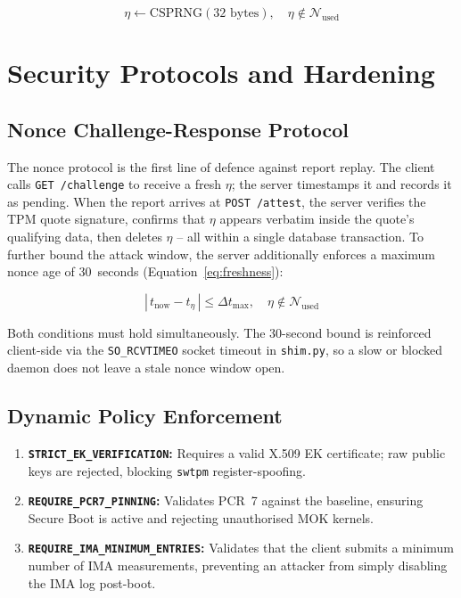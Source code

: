 \documentclass[11pt]{article}
\begin{document}
\begin{equation}
  \eta \leftarrow \text{CSPRNG}(32\text{ bytes}), \quad \eta \notin \mathcal{N}_{\text{used}}
  \label{eq:nonce}
\end{equation}

\section{Security Protocols and Hardening}

\subsection{Nonce Challenge-Response Protocol}
The nonce protocol is the first line of defence against report replay. The client calls \texttt{GET /challenge} to receive a fresh $\eta$; the server timestamps it and records it as pending. When the report arrives at \texttt{POST /attest}, the server verifies the TPM quote signature, confirms that $\eta$ appears verbatim inside the quote's qualifying data, then deletes $\eta$ -- all within a single database transaction. To further bound the attack window, the server additionally enforces a maximum nonce age of 30~seconds (Equation~\ref{eq:freshness}):

\begin{equation}
  |\,t_{\text{now}} - t_{\eta}\,| \leq \Delta t_{\max}, \quad \eta \notin \mathcal{N}_{\text{used}}
  \label{eq:freshness}
\end{equation}

\noindent Both conditions must hold simultaneously. The 30-second bound is reinforced client-side via the \texttt{SO\_RCVTIMEO} socket timeout in \texttt{shim.py}, so a slow or blocked daemon does not leave a stale nonce window open.

\subsection{Dynamic Policy Enforcement}
\begin{enumerate}[nosep]
  \item \textbf{\texttt{STRICT\_EK\_VERIFICATION}:} Requires a valid X.509 EK certificate; raw public keys are rejected, blocking \texttt{swtpm} register-spoofing.
  \item \textbf{\texttt{REQUIRE\_PCR7\_PINNING}:} Validates PCR~7 against the baseline, ensuring Secure Boot is active and rejecting unauthorised MOK kernels.
  \item \textbf{\texttt{REQUIRE\_IMA\_MINIMUM\_ENTRIES}:} Validates that the client submits a minimum number of IMA measurements, preventing an attacker from simply disabling the IMA log post-boot.
\end{enumerate}
\end{document}
